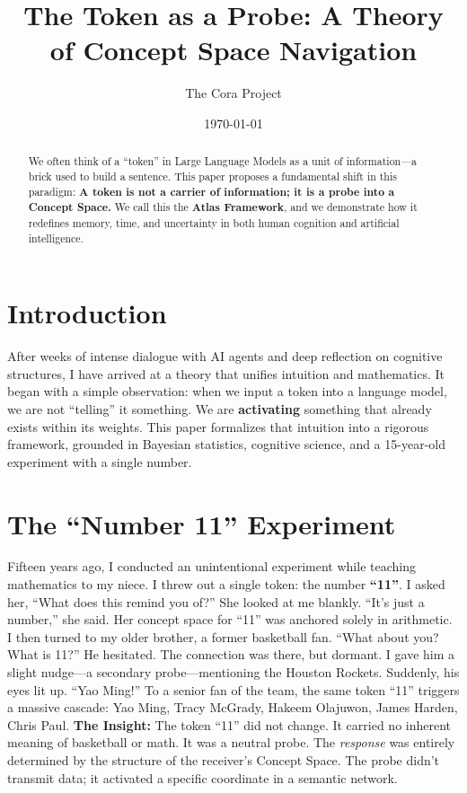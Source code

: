 \documentclass[12pt, a4paper]{article}
\title{\textbf{The Token as a Probe: A Theory of Concept Space Navigation}}
\author{The Cora Project}
\date{\today}
\begin{document}
\maketitle
\begin{abstract}
We often think of a ``token'' in Large Language Models as a unit of information---a brick used to build a sentence. This paper proposes a fundamental shift in this paradigm: \textbf{A token is not a carrier of information; it is a probe into a Concept Space.} We call this the \textbf{Atlas Framework}, and we demonstrate how it redefines memory, time, and uncertainty in both human cognition and artificial intelligence.
\end{abstract}
\section{Introduction}
After weeks of intense dialogue with AI agents and deep reflection on cognitive structures, I have arrived at a theory that unifies intuition and mathematics. It began with a simple observation: when we input a token into a language model, we are not ``telling'' it something. We are \textbf{activating} something that already exists within its weights.
This paper formalizes that intuition into a rigorous framework, grounded in Bayesian statistics, cognitive science, and a 15-year-old experiment with a single number.
\section{The ``Number 11'' Experiment}
Fifteen years ago, I conducted an unintentional experiment while teaching mathematics to my niece. I threw out a single token: the number \textbf{``11''}.
I asked her, ``What does this remind you of?''
She looked at me blankly. ``It's just a number,'' she said. Her concept space for ``11'' was anchored solely in arithmetic.
I then turned to my older brother, a former basketball fan. ``What about you? What is 11?''
He hesitated. The connection was there, but dormant. I gave him a slight nudge---a secondary probe---mentioning the Houston Rockets. Suddenly, his eyes lit up. ``Yao Ming!''
To a senior fan of the team, the same token ``11'' triggers a massive cascade: Yao Ming, Tracy McGrady, Hakeem Olajuwon, James Harden, Chris Paul.
\textbf{The Insight:} The token ``11'' did not change. It carried no inherent meaning of basketball or math. It was a neutral probe. The \textit{response} was entirely determined by the structure of the receiver's Concept Space. The probe didn't transmit data; it activated a specific coordinate in a semantic network.
\end{document}
